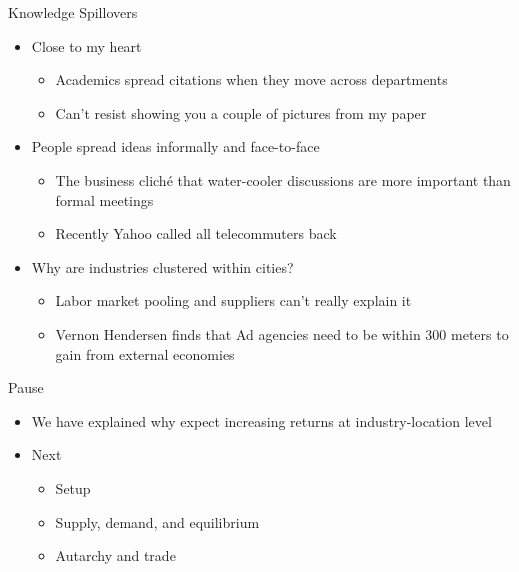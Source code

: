 \documentclass[ignorenonframetext,]{beamer}
\begin{document}
\begin{frame}{Knowledge Spillovers}

    \begin{itemize}
        \item Close to my heart
        \begin{itemize}
            \item Academics spread citations when they move across departments
            \item Can't resist showing you a couple of pictures from my paper
        \end{itemize}
        \item People spread ideas informally and face-to-face
        \begin{itemize}
            \item The business cliché that water-cooler discussions are more important than formal meetings
            \item Recently Yahoo called all telecommuters back
        \end{itemize}
        \item Why are industries clustered within cities?
        \begin{itemize}
            \item Labor market pooling and suppliers can't really explain it
            \item Vernon Hendersen finds that Ad agencies need to be within 300 meters to gain from external economies
        \end{itemize}
    \end{itemize}

\end{frame}

\begin{frame}{Pause}

    \begin{itemize}
        \item We have explained why expect increasing returns at industry-location level
        \item Next
        \begin{itemize}
            \item Setup
            \item Supply, demand, and equilibrium 
            \item Autarchy and trade  
        \end{itemize}
    \end{itemize}

\end{frame}
\end{document}
